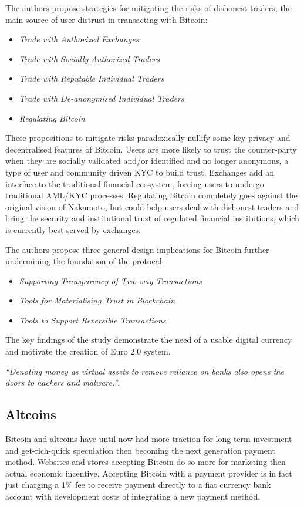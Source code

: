 \documentclass[12pt]{article} %
\begin{document}
The authors propose strategies for mitigating the risks of dishonest traders, the main source of user distrust in transacting with Bitcoin: 
\begin{itemize}
	\item \textit{Trade with Authorized Exchanges}
	\item \textit{Trade with Socially Authorized Traders}
	\item \textit{Trade with Reputable Individual Traders}
	\item \textit{Trade with De-anonymised Individual Traders}
	\item \textit{Regulating Bitcoin}
\end{itemize}
These propositions to mitigate risks paradoxically nullify some key privacy and decentralised features of Bitcoin. Users are more likely to trust the counter-party when they are socially validated and/or identified and no longer anonymous, a type of user and community driven KYC to build trust. Exchanges add an interface to the traditional financial ecosystem, forcing users to undergo traditional AML/KYC processes. Regulating Bitcoin completely goes against the original vision of Nakamoto, but could help users deal with dishonest traders and bring the security and institutional trust of regulated financial institutions, which is currently best served by exchanges.

The authors propose three general design implications for Bitcoin further undermining the foundation of the protocal:
\begin{itemize}
	\item \textit{Supporting Transparency of Two-way Transactions}
	\item \textit{Tools for Materialising Trust in Blockchain}
	\item \textit{Tools to Support Reversible Transactions}
\end{itemize}
The key findings of the study demonstrate the need of a usable digital currency and motivate the creation of Euro 2.0 system.

\textit{``Denoting money as virtual assets to remove reliance on banks also opens the doors to hackers and malware.''}\cite{Ali:2015:BPU:2990603.2990632}.

\subsection{Altcoins}
Bitcoin and altcoins have until now had more traction for long term investment and get-rich-quick speculation then becoming the next generation payment method. Websites and stores accepting Bitcoin do so more for marketing then actual economic incentive. Accepting Bitcoin with a payment provider is in fact just charging a 1\% fee to receive payment directly to a fiat currency bank account with development costs of integrating a new payment method.
\end{document}
